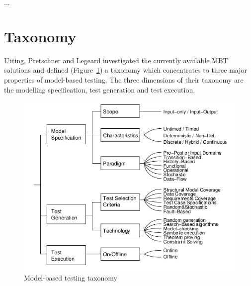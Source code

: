 ...


\section{Taxonomy}
\label{sec:taxonomy}

Utting, Pretschner and Legeard investigated the currently available MBT solutions and defined (Figure~\ref{fig:mbttaxonomy}) a taxonomy which concentrates to three major properties of model-based testing. The three dimensions of their taxonomy are the modelling specification, test generation and test execution.

\begin{figure}[htp]
\centering
\includegraphics[scale=0.5]{figures/mbt_taxonomy.png}
\caption{Model-based testing taxonomy \cite{taxonomy}}
\label{fig:mbttaxonomy}
\end{figure}

